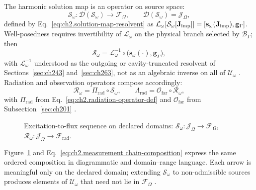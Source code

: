 The harmonic solution map is an operator on source space:
\begin{equation}
\label{eq:ch2.solution-operator-domain}
\mathcal{S}_\omega:\mathcal{D}(\mathcal{S}_\omega)\longrightarrow\mathcal{F}_\Omega,
\qquad
\mathcal{D}(\mathcal{S}_\omega)=\mathcal{J}_\Omega,
\end{equation}
defined by Eq.~\eqref{eq:ch2.solution-map-resolvent} as \(\mathcal{L}_\omega[\mathcal{S}_\omega[\mathbf{J}_{\mathrm{imp}}]]=[\mathbf{s}_\omega(\mathbf{J}_{\mathrm{imp}}),\mathbf{g}_\Gamma]\). Well-posedness requires invertibility of \(\mathcal{L}_\omega\) on the physical branch selected by \(\mathcal{B}_\Gamma\); then
\begin{equation}
\label{eq:ch2.resolvent-operator}
\mathcal{S}_\omega=\mathcal{L}_\omega^{-1}\circ
\big(\mathbf{s}_\omega(\cdot),\mathbf{g}_\Gamma\big),
\end{equation}
with \(\mathcal{L}_\omega^{-1}\) understood as the outgoing or cavity-truncated resolvent of Sections~\ref{sec:ch243} and~\ref{sec:ch263}, not as an algebraic inverse on all of \(\mathcal{U}_\omega\) \cite{stratton1941}. Radiation and observation operators compose accordingly:
\begin{equation}
\label{eq:ch2.radiation-operator-composition}
\mathcal{R}_\omega=\Pi_{\mathrm{rad}}\circ\mathcal{S}_\omega,
\qquad
\Lambda_{\mathrm{rad}}=\mathcal{O}_{\mathrm{far}}\circ\mathcal{R}_\omega,
\end{equation}
with \(\Pi_{\mathrm{rad}}\) from Eq.~\eqref{eq:ch2.radiation-operator-def} and \(\mathcal{O}_{\mathrm{far}}\) from Subsection~\ref{sec:ch201} \cite{harrington2001}.
\begin{figure}[t]
\centering
{}
\caption{Excitation-to-flux sequence on declared domains:
\(\mathcal{S}_\omega:\mathcal{J}_\Omega\to\mathcal{F}_\Omega\),
\(\mathcal{R}_\omega:\mathcal{J}_\Omega\to\mathcal{F}_{\mathrm{rad}}\).}
\label{fig:ch2.solution-radiation-operator-composition}
\end{figure}
Figure~\ref{fig:ch2.solution-radiation-operator-composition} and Eq.~\eqref{eq:ch2.measurement chain-composition} express the same ordered composition in diagrammatic and domain--range language. Each arrow is meaningful only on the declared domain; extending \(\mathcal{S}_\omega\) to non-admissible sources produces elements of \(\mathcal{U}_\omega\) that need not lie in \(\mathcal{F}_\Omega\) \cite{stratton1941}.

